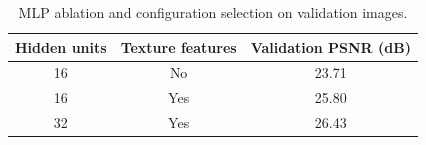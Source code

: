 \begin{table}[ht]
\centering\small
\caption{MLP ablation and configuration selection on validation images.}
\label{tab:ablation}
\begin{tabular}{ccc}
\toprule
Hidden units & Texture features & Validation PSNR (dB) \\
\midrule
16 & No & 23.71 \\
16 & Yes & 25.80 \\
32 & Yes & 26.43 \\
\bottomrule
\end{tabular}
\end{table}
